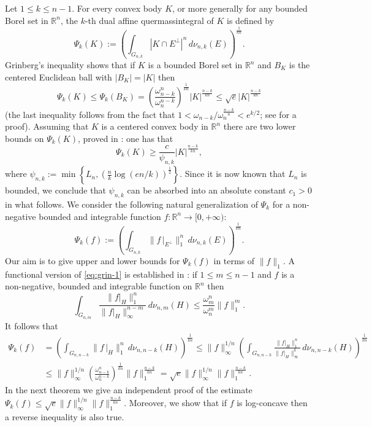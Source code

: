 \documentclass[11pt,leqno]{article}
\theoremstyle{definition}
\theoremstyle{remark}
\numberwithin{equation}{section}
\newcommand{\ls}{\leqslant}
\newcommand{\gr}{\geqslant}
\newcommand{\1}{\textbf{1}}
\begin{document}
Let $1\ls k\ls n-1$. For every convex body $K$, or more generally for any bounded Borel set in $\mathbb{R}^n$,
the $k$-th dual affine quermassintegral of $K$ is defined by
\begin{equation*}
\Psi_k(K):= \left(\int_{G_{n,k}} |K\cap E^{\perp}|^n \,d\nu_{n,k}(E) \right)^{\frac{1}{kn}}.
\end{equation*}
Grinberg's inequality shows that if $K$ is a bounded Borel set in ${\mathbb R}^n$ and $B_K$ is the centered
Euclidean ball with $|B_K|=|K|$ then
\begin{equation}\label{eq:dual-Phi-upper-bound}
\Psi_k(K)\ls \Psi_k(B_K) =\left(\frac{\omega_{n-k}^n}{\omega_n^{n-k}}\right)^{\frac{1}{kn}}|K|^{\frac{n-k}{kn}}\ls \sqrt{e}|K|^{\frac{n-k}{kn}}
\end{equation}
(the last inequality follows from the fact that $1<\omega_{n-k}/\omega_n^{\frac{n-k}{n}}<e^{k/2}$; see \cite[Lemma~2.1]{Koldobsky-Lifshits-2000} for a proof).
Assuming that $K$ is a centered convex body in ${\mathbb R}^n$ there are two lower bounds on $\Psi_k(K)$, proved in \cite{DP-Phi}:
one has that
\begin{equation}\label{eq:dual-Phi-lower-bounds}
\Psi_k(K) \gr \frac{c}{\psi_{n,k}}|K|^{\frac{n-k}{kn}},
\end{equation}
where $\psi_{n,k}:=\min\left\{L_n,\left(\frac{n}{k}\log(en/k)\right)^{\frac{1}{2}}\right\}$. Since it is now known that $L_n$ is bounded, we conclude
that $\psi_{n,k}$ can be absorbed into an absolute constant $c_1>0$ in what follows. We consider the following natural
generalization of $\Psi_k$ for a non-negative bounded and integrable function $f:{\mathbb R}^n\to [0,+\infty)$:
$$\Psi_k(f):=\left(\int_{G_{n,k}} \|f\,\big|_{E^{\perp}}\|_1^n \,d\nu_{n,k}(E) \right)^{\frac{1}{kn}}.$$
Our aim is to give upper and lower bounds for $\Psi_k(f)$ in terms of $\|f\|_1$.
A functional version of \eqref{eq:grin-1} is established in \cite{Dann-Paouris-Pivovarov-2015}: if $1\ls m \ls n-1$
and $f$ is a non-negative, bounded and integrable function on $\mathbb{R}^n$ then
\begin{equation}\label{eq:intro-grin-6}
\int_{G_{n,m}} \frac{\|f|_H\|_1^n}{\|f|_H\|_\infty^{n-m}} \,d\nu_{n,m}(H) \ls \frac{\omega_m^n}{\omega_n^m}\|f\|_1^m.
\end{equation}
It follows that
\begin{align*}\Psi_k(f)&=\left(\int_{G_{n,n-k}} \|f\,\big|_H\|_1^n \,d\nu_{n,n-k}(H) \right)^{\frac{1}{kn}}\ls \|f\|_{\infty}^{1/n}\left(\int_{G_{n,n-k}} \frac{\|f|_H\|_1^n}{\|f|_H\|_\infty^{k}} \,d\nu_{n,n-k}(H) \right)^{\frac{1}{kn}}\\
&\ls\|f\|_{\infty}^{1/n}\left(\frac{\omega_{n-k}^n}{\omega_n^{n-k}}\right)^{\frac{1}{kn}}\|f\|_1^{\frac{n-k}{kn}}
=\sqrt{e}\|f\|_{\infty}^{1/n}\|f\|_1^{\frac{n-k}{kn}}.
\end{align*}
In the next theorem we give an independent proof of the estimate $\Psi_k(f)\ls \sqrt{e}\|f\|_{\infty}^{1/n}\|f\|_1^{\frac{n-k}{kn}}$.
Moreover, we show that if $f$ is log-concave then a reverse inequality is also true.
\end{document}

